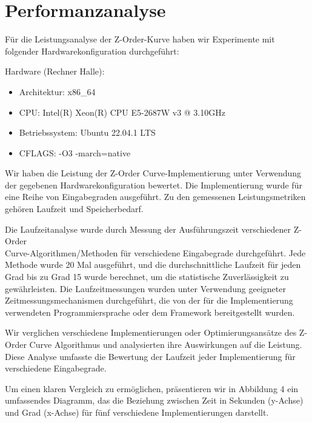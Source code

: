 \documentclass[course=erap]{aspdoc}
\begin{document}
\section{Performanzanalyse}

\noindent Für die Leistungsanalyse der Z-Order-Kurve haben wir Experimente mit folgender Hardwarekonfiguration durchgeführt:

Hardware (Rechner Halle):
\begin{itemize}
  \item Architektur: x86\_64
  \item CPU: Intel(R) Xeon(R) CPU E5-2687W v3 @ 3.10GHz
  \item Betriebssystem: Ubuntu 22.04.1 LTS
  \item CFLAGS: -O3 -march=native
\end{itemize}

\noindent Wir haben die Leistung der Z-Order Curve-Implementierung unter Verwendung der gegebenen Hardwarekonfiguration bewertet. Die Implementierung wurde für eine Reihe von Eingabegraden ausgeführt. Zu den gemessenen Leistungsmetriken gehören Laufzeit und Speicherbedarf.

\noindent Die Laufzeitanalyse wurde durch Messung der Ausführungszeit verschiedener Z-Order\\ Curve-Algorithmen/Methoden für verschiedene Eingabegrade durchgeführt. Jede Methode wurde 20 Mal ausgeführt, und die durchschnittliche Laufzeit für jeden Grad bis zu Grad 15 wurde berechnet, um die statistische Zuverlässigkeit zu gewährleisten. Die Laufzeitmessungen wurden unter Verwendung geeigneter Zeitmessungsmechanismen durchgeführt, die von der für die Implementierung verwendeten Programmiersprache oder dem Framework bereitgestellt wurden.

\noindent Wir verglichen verschiedene Implementierungen oder Optimierungsansätze des Z-Order Curve Algorithmus und analysierten ihre Auswirkungen auf die Leistung. Diese Analyse umfasste die Bewertung der Laufzeit jeder Implementierung für verschiedene Eingabegrade.

\noindent Um einen klaren Vergleich zu ermöglichen, präsentieren wir in Abbildung 4 ein umfassendes Diagramm, das die Beziehung zwischen Zeit in Sekunden (y-Achse) und Grad (x-Achse) für fünf verschiedene Implementierungen darstellt.
\end{document}
